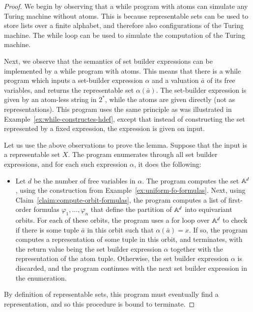 \begin{proof}
	We begin by observing that a while program with atoms can simulate any Turing machine without atoms.  This is because representable sets can be used to store lists over a finite alphabet, and therefore also configurations of the Turing machine. The  while loop can be used to simulate the computation of the  Turing machine. 

	Next, we observe  that the semantics of set builder expressions can be implemented by a while program with atoms. This means that there is a while program which inputs a set-builder expression $\alpha$  and a valuation $\bar a$ of its free variables, and returns the representable set $\alpha(\bar a)$. The set-builder expression is given by an atom-less string in $2^*$, while the atoms are given directly (not as representations). This program uses the same principle as was illustrated in Example~\ref{ex:while-constructes-hdef}, except that instead of constructing the set represented by a fixed expression, the expression is given on input. 

	Let us use the above observations to prove the lemma. Suppose that the input is  a representable set $X$. The program enumerates through all set builder expressions, and for each such expression $\alpha$, it does the following:
	\begin{itemize}
		\item Let $d$ be the number of free variables in $\alpha$.  The program computes the set $\mathbb A^d$, using the construction from Example~\ref{ex:uniform-fo-formulas}. Next, using Claim~\ref{claim:compute-orbit-formulas}, the program computes a list of  first-order formulas $\varphi_1,\ldots,\varphi_n$ that define the partition of $\mathbb A^d$ into  equivariant orbits.  For each of these orbits, the program  uses a for loop over $\mathbb A^d$ to  check if there is some tuple $\bar a$ in this orbit  such that $\alpha(\bar a) = x$. If so, the program computes a representation of some tuple in this orbit, and terminates, with the return value being   the set builder expression $\alpha$ together with the representation of the atom tuple.  Otherwise, the set builder expression  $\alpha$ is discarded, and the program continues  with the next set builder expression  in the enumeration.
	\end{itemize}
	By definition of representable sets, this program must eventually find a representation, and so  this procedure is bound to terminate. 
\end{proof}

